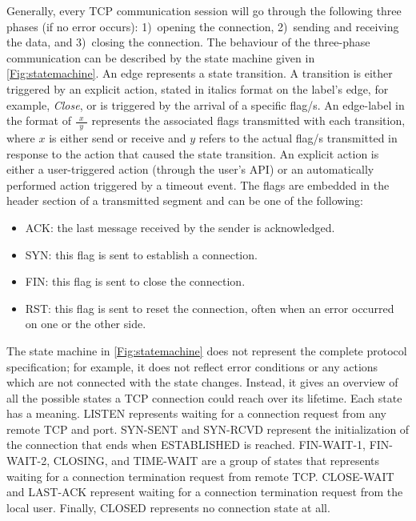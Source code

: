 \documentclass[conference]{IEEEtran}
\def\state#1{\textsf{\MakeUppercase{#1}}\xspace}
\def\sclosed{\state{closed}}
\def\ssynsent{\state{syn-sent}}
\def\ssynrcv{\state{syn-rcvd}}
\def\slisten{\state{listen}}
\def\sestab{\state{established}}
\def\sfwone{\state{fin-wait-1}}
\def\sfwtwo{\state{fin-wait-2}}
\def\sclosing{\state{closing}}
\def\sclosew{\state{close-wait}}
\def\slastack{\state{last-ack}}
\def\stimewait{\state{time-wait}}
\def\flag#1{\textsf{#1}\xspace}
\def\syn{\flag{SYN}}
\def\ack{\flag{ACK}}
\def\rst{\flag{RST}}
\def\fin{\flag{FIN}}
\begin{document}
Generally, every TCP communication session will go through the following three phases (if no error occurs): 1)~opening the connection, 2)~sending and receiving the data, and 3)~closing the connection. The behaviour of the three-phase communication can be described by the state machine given in \cref{Fig:statemachine}. An edge represents a state transition. A transition is either triggered by an explicit action, stated in italics format on the label's edge, for example, \textit{Close}, or is triggered by the arrival of a specific flag/s. An edge-label in the format of $\frac{\ \ x \ \ }{\ \ y \ \ }$ represents the associated flags transmitted with each transition, where $x$ is either send or receive and $y$ refers to the actual flag/s transmitted in response to the action that caused the state transition. An explicit action is either a user-triggered action (through the user's API) or an automatically performed action triggered by a timeout event. The flags are embedded in the header section of a transmitted segment and can be one of the following:
\begin{itemize}
\item \ack: the last message received by the sender is acknowledged.
\item \syn: this flag is sent to establish a connection.
\item \fin: this flag is sent to close the connection.
\item \rst: this flag is sent to reset the connection, often when an error
occurred on one or the other side.
\end{itemize}

The state machine in \cref{Fig:statemachine} does not represent the complete protocol specification; for example, it does not reflect error conditions or any actions which are not connected with the state changes. Instead, it gives an overview of all the possible states a TCP connection could reach over its lifetime. Each state has a meaning. \slisten represents waiting for a connection request from any remote TCP and port. \ssynsent and \ssynrcv represent the initialization of the connection that ends when \sestab is reached. \sfwone, \sfwtwo, \sclosing, and \stimewait are a group of states that represents waiting for a connection termination request from remote TCP. \sclosew and \slastack represent waiting for a connection termination request from the local user. Finally, \sclosed represents no connection state at all.

\end{document}
